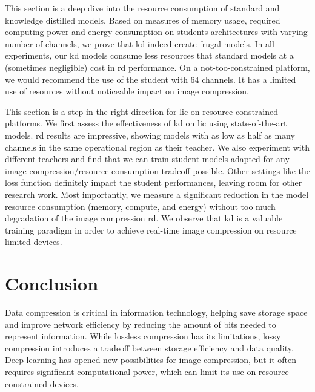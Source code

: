 \documentclass{article}
\begin{document}
This section is a deep dive into the resource consumption of standard and knowledge distilled models. Based on measures of memory usage, required computing power and energy consumption on students architectures with varying number of channels, we prove that \acrshort{kd} indeed create frugal models. In all experiments, our \acrshort{kd} models consume less resources that standard models at a (sometimes negligible) cost in \acrshort{rd} performance. On a not-too-constrained platform, we would recommend the use of the student with 64 channels. It has a limited use of resources without noticeable impact on image compression.

This section is a step in the right direction for \acrshort{lic} on resource-constrained platforms. We first assess the effectiveness of \acrshort{kd} on \acrshort{lic} using state-of-the-art models. \acrshort{rd} results are impressive, showing models with as low as half as many channels in the same operational region as their teacher. We also experiment with different teachers and find that we can train student models adapted for any image compression/resource consumption tradeoff possible. Other settings like the loss function definitely impact the student performances, leaving room for other research work. Most importantly, we measure a significant reduction in the model resource consumption (memory, compute, and energy) without too much degradation of the image compression \acrshort{rd}. We observe that \acrshort{kd} is a valuable training paradigm in order to achieve real-time image compression on resource limited devices.

\section{Conclusion}
Data compression is critical in information technology, helping save storage space and improve network efficiency by reducing the amount of bits needed to represent information. While lossless compression has its limitations, lossy compression introduces a tradeoff between storage efficiency and data quality. Deep learning has opened new possibilities for image compression, but it often requires significant computational power, which can limit its use on resource-constrained devices.
\end{document}
